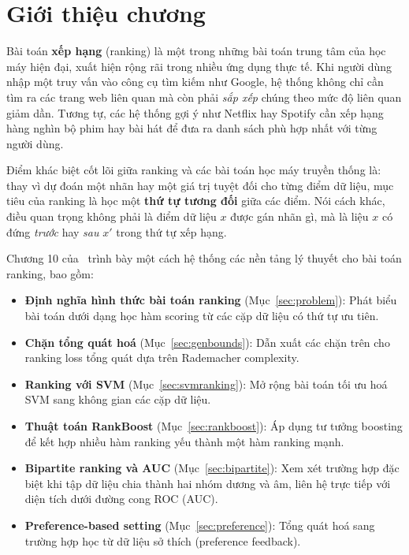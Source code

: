
\section{Giới thiệu chương}
\label{sec:intro}

Bài toán \textbf{xếp hạng} (ranking) là một trong những bài toán 
trung tâm của học máy hiện đại, xuất hiện rộng rãi trong nhiều 
ứng dụng thực tế. Khi người dùng nhập một truy vấn vào công cụ 
tìm kiếm như Google, hệ thống không chỉ cần tìm ra các trang web 
liên quan mà còn phải \textit{sắp xếp} chúng theo mức độ liên quan 
giảm dần. Tương tự, các hệ thống gợi ý như Netflix hay Spotify cần 
xếp hạng hàng nghìn bộ phim hay bài hát để đưa ra danh sách phù hợp 
nhất với từng người dùng.

Điểm khác biệt cốt lõi giữa ranking và các bài toán học máy truyền 
thống là: thay vì dự đoán một nhãn hay một giá trị tuyệt đối cho 
từng điểm dữ liệu, mục tiêu của ranking là học một \textbf{thứ tự 
tương đối} giữa các điểm. Nói cách khác, điều quan trọng không phải 
là điểm dữ liệu $x$ được gán nhãn gì, mà là liệu $x$ có đứng 
\textit{trước} hay \textit{sau} $x'$ trong thứ tự xếp hạng.

Chương 10 của~\cite{mohri2018foundations} trình bày một cách hệ thống 
các nền tảng lý thuyết cho bài toán ranking, bao gồm:

\begin{itemize}
  \item \textbf{Định nghĩa hình thức bài toán ranking} 
        (Mục~\ref{sec:problem}): Phát biểu bài toán dưới dạng học 
        hàm scoring từ các cặp dữ liệu có thứ tự ưu tiên.

  \item \textbf{Chặn tổng quát hoá} 
        (Mục~\ref{sec:genbounds}): Dẫn xuất các chặn trên cho 
        ranking loss tổng quát dựa trên Rademacher complexity.

  \item \textbf{Ranking với SVM} 
        (Mục~\ref{sec:svmranking}): Mở rộng bài toán tối ưu hoá 
        SVM sang không gian các cặp dữ liệu.

  \item \textbf{Thuật toán RankBoost} 
        (Mục~\ref{sec:rankboost}): Áp dụng tư tưởng boosting để 
        kết hợp nhiều hàm ranking yếu thành một hàm ranking mạnh.

  \item \textbf{Bipartite ranking và AUC} 
        (Mục~\ref{sec:bipartite}): Xem xét trường hợp đặc biệt 
        khi tập dữ liệu chia thành hai nhóm dương và âm, liên hệ 
        trực tiếp với diện tích dưới đường cong ROC (AUC).

  \item \textbf{Preference-based setting} 
        (Mục~\ref{sec:preference}): Tổng quát hoá sang trường hợp 
        học từ dữ liệu sở thích (preference feedback).
\end{itemize}


